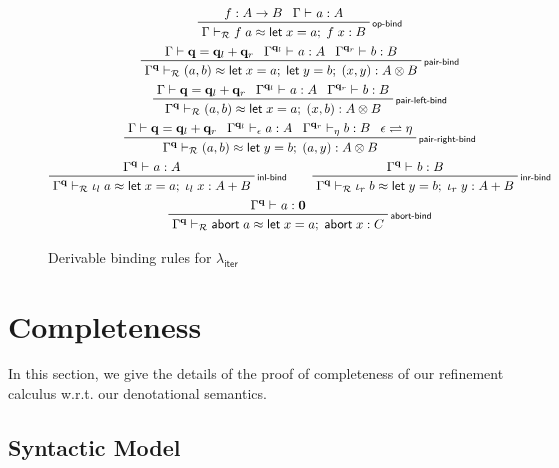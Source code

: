 \documentclass[acmsmall,screen,review]{acmart}
\newcommand{\mc}[1]{\ensuremath{\mathcal{#1}}}
\newcommand{\mb}[1]{\ensuremath{\mathbf{#1}}}
\newcommand{\ms}[1]{\ensuremath{\mathsf{#1}}}
\newcommand{\linl}[1]{\iota_l\;{#1}}
\newcommand{\linr}[1]{\iota_r\;{#1}}
\newcommand{\labort}[1]{\ms{abort}\;{#1}}
\newcommand{\letexpr}[3]{\ensuremath{\ms{let}\;#1 = #2;\;#3}}
\newcommand{\qsp}[4]{#1 \vdash #2 = #3 + #4}
\newcommand{\rle}[1]{{\scriptsize\textsf{#1}}}
\newcommand{\hasty}[4]{#1 \vdash_{#2} #3: {#4}}
\newcommand{\teqv}{\approx}
\newcommand{\tmeq}[5]{#1 \vdash_{#2} #3 \teqv #4 : {#5}}
\newcommand{\subiterexp}{\texorpdfstring{\(\lambda_{\ms{iter}}\)}{lambda-iter}}
\newcommand{\slides}{\rightleftharpoons}
\begin{document}
\begin{figure}
  \begin{gather*}
    \prftree[r]{\rle{op-bind}}
      {f : A \to B}
      {\hasty{\Gamma}{}{a}{A}}
      {\tmeq{\Gamma}{\mc{R}}{f\;a}{\letexpr{x}{a}{f\;x}}{B}} 
      \\
    \prftree[r]{\rle{pair-bind}}
      {\qsp{\Gamma}{\mb{q}}{\mb{q}_l}{\mb{q}_r}}
      {\hasty{\Gamma^{\mb{q}_l}}{}{a}{A}}
      {\hasty{\Gamma^{\mb{q}_r}}{}{b}{B}}
      {\tmeq{\Gamma^{\mb{q}}}{\mc{R}}{(a, b)}{\letexpr{x}{a}{\letexpr{y}{b}{(x, y)}}}{A \otimes B}} 
      \\
    \prftree[r]{\rle{pair-left-bind}}
      {\qsp{\Gamma}{\mb{q}}{\mb{q}_l}{\mb{q}_r}}
      {\hasty{\Gamma^{\mb{q}_l}}{}{a}{A}}
      {\hasty{\Gamma^{\mb{q}_r}}{}{b}{B}}
      {\tmeq{\Gamma^{\mb{q}}}{\mc{R}}{(a, b)}{\letexpr{x}{a}{(x, b)}}{A \otimes B}} 
      \\
    \prftree[r]{\rle{pair-right-bind}}
      {\qsp{\Gamma}{\mb{q}}{\mb{q}_l}{\mb{q}_r}}
      {\hasty{\Gamma^{\mb{q}_l}}{\epsilon}{a}{A}}
      {\hasty{\Gamma^{\mb{q}_r}}{\eta}{b}{B}}
      {\epsilon \slides \eta}
      {\tmeq{\Gamma^{\mb{q}}}{\mc{R}}{(a, b)}{\letexpr{y}{b}{(a, y)}}{A \otimes B}} 
      \\
    \prftree[r]{\rle{inl-bind}}
      {\hasty{\Gamma^{\mb{q}}}{}{a}{A}}
      {\tmeq{\Gamma^{\mb{q}}}{\mc{R}}{\linl{a}}{\letexpr{x}{a}{\linl{x}}}{A + B}} \qquad
    \prftree[r]{\rle{inr-bind}}
      {\hasty{\Gamma^{\mb{q}}}{}{b}{B}}
      {\tmeq{\Gamma^{\mb{q}}}{\mc{R}}
      {\linr{b}}{\letexpr{y}{b}{\linr{y}}}{A + B}} 
      \\
    \prftree[r]{\rle{abort-bind}}
      {\hasty{\Gamma^{\mb{q}}}{}{a}{\mb{0}}}
      {\tmeq{\Gamma^{\mb{q}}}{\mc{R}}{\labort{a}}{\letexpr{x}{a}{\labort{x}}}{C}} 
      \\
  \end{gather*}
  \caption{Derivable binding rules for \subiterexp{}}
  \Description{}
  \label{fig:derivable-binding}
\end{figure}

\section{Completeness}

\label{apx:completeness}

In this section, we give the details of the proof of completeness of our refinement calculus w.r.t.
our denotational semantics.

\subsection{Syntactic Model}
\end{document}
